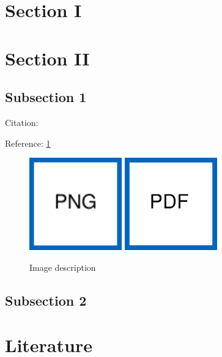 \documentclass[YQMreport, %
							 optBiber   %
							 ]{YQMlatex}%
\begin{document}
%

	\section{Section I}
		\blindtext%

	\section{Section II}
		\subsection{Subsection 1}
			Citation: \cite{dlr51175}\par%
			Reference: \cref{fig:MyImage}\par%
			\begin{figure}[htb]%
			    \centering%
			    \includegraphics[width=40mm]{figures/ImagePNG.png}%
			    \hspace*{5mm}%
			    \includegraphics[width=40mm]{figures/ImagePDF.pdf}\par%
			    \caption{Image description}%
			    \label{fig:MyImage}%
			\end{figure}
		\subsection{Subsection 2}
			\blindtext

	\section{Literature}
		\printbibliography[heading=none]%
\end{document}
